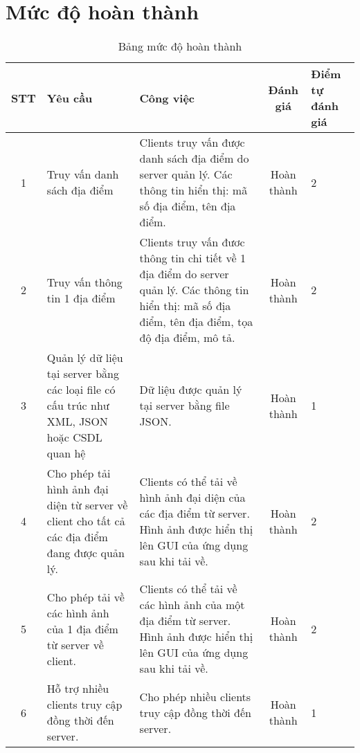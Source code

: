\section{Mức độ hoàn thành}
\begin{table}[H]
\begin{tabular}{|c| p{}| p{}|c|p{}|}
\hline
\textbf{STT} & \textbf{Yêu cầu                                                                                      } & \textbf{Công việc}                                                                                                                                               & \textbf{Đánh giá}   & \textbf{Điểm tự đánh giá} \\
\hline 
1   & Truy vấn danh sách địa điểm                                                                   & Clients truy vấn được danh sách địa điểm do server quản lý. Các thông tin hiển thị: mã số địa điểm, tên địa điểm.                                       & Hoàn thành & 2                \\
\hline 
2   & Truy vấn thông tin 1 địa điểm                                                                 & Clients truy vấn đươc thông tin chi tiết về 1 địa điểm do server quản lý. Các thông tin hiển thị: mã số địa điểm, tên địa điểm, tọa độ địa điểm, mô tả. & Hoàn thành & 2                \\
\hline 
3   & Quản lý dữ liệu tại server bằng các loại file có cấu trúc như XML, JSON hoặc CSDL quan hệ     & Dữ liệu được quản lý tại server bằng file JSON.                                                                                                         & Hoàn thành & 1                \\
\hline 
4   & Cho phép tải hình ảnh đại diện từ server về client cho tất cả các địa điểm đang được quản lý. & Clients có thể tải về hình ảnh đại diện của các địa điểm từ server. Hình ảnh được hiển thị lên GUI của ứng dụng sau khi tải về.                         & Hoàn thành & 2                \\
\hline 
5   & Cho phép tải về các hình ảnh của 1 địa điểm từ server về client.                              & Clients có thể tải về các hình ảnh của một địa điểm từ server. Hình ảnh được hiển thị lên GUI của ứng dụng sau khi tải về.                              & Hoàn thành & 2                \\
\hline 
6   & Hỗ trợ nhiều clients truy cập đồng thời đến server.                                           & Cho phép nhiều clients truy cập đồng thời đến server.                                                                                       & Hoàn thành & 1 \\ 
\hline  
\end{tabular}
\caption{Bảng mức độ hoàn thành}
\end{table}